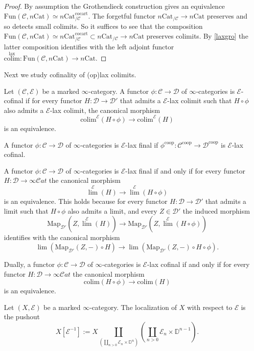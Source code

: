 \documentclass[10pt,oneside]{article}
\numberwithin{equation}{section} %
\numberwithin{figure}{section} %
\theoremstyle{plain}
\theoremstyle{definition}
\newcommand{\bD}{{\mathbb D}}
\newcommand{\mC}{{\mathcal C}}
\newcommand{\mD}{{\mathcal D}}
\newcommand{\mE}{{\mathcal E}}
\newcommand{\op}{\mathrm{op}}
\newcommand{\colim}{\mathrm{colim}}
\newcommand{\co}{\mathrm{co}}
\newcommand{\Cat}{\mathrm{Cat}}
\newcommand{\Fun}{\mathrm{Fun}}
\newcommand{\cocart}{{\mathrm{cocart}}}
\newcommand{\lax}{{\mathrm{lax}}}
\newcommand{\Map}{{\mathrm{Map}}}
\newcommand{\scat}{\mathcal{C}\mathit{at}}
\begin{document}
\begin{proof}

By assumption the Grothendieck construction gives an 
equivalence
$\Fun(\mC, n\Cat) \simeq n\Cat^\cocart_{/\mC}.$
The forgetful functor ${n\Cat}_{/\mC} \to {n\Cat}$
preserves and so detects small colimits. 
So it suffices to see that the composition 
$\Fun(\mC, n\Cat) \simeq n\Cat^\cocart_{/\mC} \subset {n\Cat}_{/\mC} \to {n\Cat}$
preserves colimits. 
By \cref{laxgro} the latter composition identifies with
the left adjoint functor $\overset{\lax}{\colim}: \Fun(\mC, n\Cat) \to {n\Cat}.$  
\end{proof}

Next we study cofinality of (op)lax colimits.

\begin{definition}Let $(\mC,\mE)$ be a marked $\infty$-category.
A functor $\phi: \mC \to \mD$ of $\infty$-categories is $\mE$-cofinal if for every functor $H: \mD \to \mD'$ that admits a $\mE$-lax colimit
such that $H \circ \phi$ also admits a $\mE$-lax colimit,
the canonical morphism $$ \colim^\mE(H \circ \phi) \to \colim^\mE(H) $$ is an equivalence.

A functor $\phi: \mC \to \mD$ of $\infty$-categories is $\mE$-lax
final if $\phi^{\co\op}: \mC^{\co\op} \to \mD^{\co\op}$ is $\mE$-lax cofinal.
    
\end{definition}

\begin{remark}
A functor $\phi: \mC \to \mD$ of $\infty$-categories is $\mE$-lax final 
if and only if for every functor $H: \mD \to \infty\scat$ 
the canonical morphism $${\lim}^\mE(H) \to {\lim}^\mE(H \circ \phi) $$ is an equivalence.
This holds because for every functor $H: \mD \to \mD'$ that admits a limit
such that $H \circ \phi$ also admits a limit, and every $Z \in \mD'$ 
the induced morphism $$ \Map_{\mD'}(Z, {\lim}^\mE(H)) \to \Map_{\mD'}(Z, {\lim}^\mE(H \circ \phi)) $$ 
identifies with the canonical morphism $$\lim(\Map_{\mD'}(Z,-)\circ H)  \to \lim(\Map_{\mD'}(Z,-)\circ H \circ \phi). $$ 

Dually, a functor $\phi: \mC \to \mD$ of $\infty$-categories is $\mE$-lax cofinal 
if and only if for every functor $H: \mD \to \infty\scat$ 
the canonical morphism $$\colim(H \circ \phi) \to \colim(H) $$ is an equivalence.
    
\end{remark}

\begin{definition}Let $(X,\mE)$ be a marked $\infty$-category.
The localization of $X$ with respect to $\mE$ is the 
pushout $$ X[\mE^{-1}]:= X \coprod_{(\coprod_{n > 0}\mE_n \times \bD^n)} (\coprod_{n > 0} \mE_n \times \bD^{n-1}).$$

\end{definition}
\end{document}
